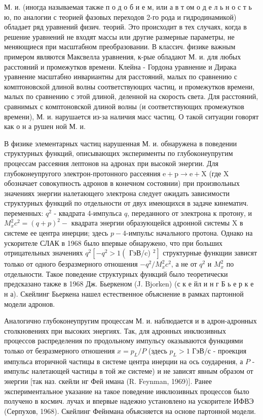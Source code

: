 \documentclass[10pt]{article}
\begin{document}
М. и. (иногда называемая также п о д о б и е м, или а в т ом о д е л ь н о с т ь ю, по аналогии с теорией фазовых переходов 2-го рода и гидродинамикой) обладает ряд уравнений физич. теорий. Это происходит в тех случаях, когда в решение уравнений не входят массы или другие размерные параметры, не меняющиеся при масштабном преобразовании. В классич. физике важным примером являются Максвелла уравнения, к-рые обладают М. и. для любых расстояний и промежутков времени. Клейна - Гордона уравнение и Дирака уравнение масштабно инвариантны для расстояний, малых по сравнению с комптоновской длиной волны соответствующих частиц, и промежутков времени, малых по сравнению с этой длиной, деленной на скорость света. Для расстояний, сравнимых с комптоновской длиной волны (и соответствующих промежутков времени), М. и. нарушается из-за наличия масс частиц. О такой ситуации говорят как о н а рушен ной М. и.



В физике элементарных частиц нарушенная М. и. обнаружена в поведении структурных функций, описывающих эксперименты по глубоконеупругим процессам рассеяния лептонов на адронах при высокой энергии. Для глубоконеупругого электрон-протонного рассеяния $\mathrm{e}+\mathrm{p} \rightarrow \mathrm{e}+\mathrm{X}$ (где X обозначает совокупность адронов в конечном состоянии) при произвольных значениях энергии налетающего электрона следует ожидать зависимости структурных функций по отдельности от двух имеющихся в задаче кинематич. переменных: $q^{2}$ - квадрата 4-импульса $q$, переданного от электрона к протону, и $M_{x}^{2} c^{2}=(q+p)^{2}-$ квадрата энергии образующейся адронной системы $\mathrm{X}$ в системе ее центра инерции; здесь $p-4$-импульс начального протона. Однако на ускорителе СЛАК в 1968 было впервые обнаружено, что при больших отрицательных значениях $q^{2}\left[-q^{2}>1\left(\right.\right.$ ГэВ/c) $\left.{ }^{2}\right]$ структурные функщии зависят только от одного безразмерного отношения $-q^{2} / M_{x}^{2} c^{2}$, а не от $q^{2}$ и $M_{x}^{2}$ по отдельности. Такое поведение структурных функций было теоретически предсказано также в 1968 Дж. Бьеркеном (J. Bjorken) (с к е йл и н г Б ь е р к е н а). Скейлинг Бьеркена нашел естественное объяснение в рамках партонной модели адронов.



Аналогично глубоконеупругим процессам М. и. наблюдается и в адрон-адронных столкновениях при высоких энергиях. Так, для адронных инклюзивных процессов распределения по продольному импульсу оказываются функциями только от безразмерного отношения $x=p_{L} / P$ (здесь $p_{L}>1$ ГэВ/с - проекция импульса вторичной частицы в системе центра инерции на ось соударения, а $P$ - импульс налетающей частицы в той же системе) и не зависят явным образом от энергии [так наз. скейли нг Фей нмана (R. Feynman, 1969)]. Ранее экспериментальное указание на такое поведение инклюзивных процессов было получено в космич. лучах и впервые надежно установлено на ускорителе ИФВЭ (Серпухов, 1968). Скейлинг Фейнмана объясняется на основе партонной модели.
\end{document}
